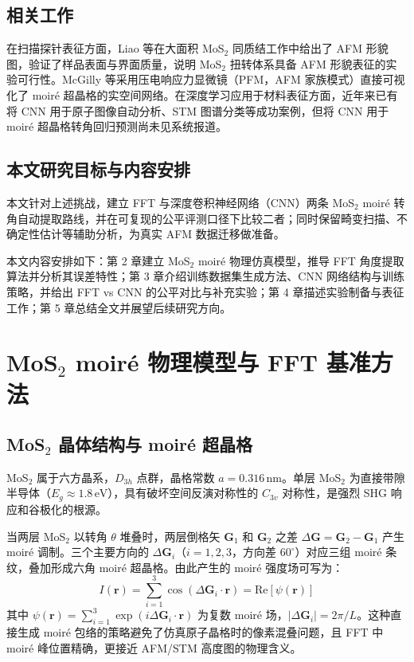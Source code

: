 \documentclass[supercite]{HustGraduPaper}
\begin{document}
\subsection{相关工作}

在扫描探针表征方面，Liao 等在大面积 MoS$_2$ 同质结工作中给出了 AFM 形貌图，验证了样品表面与界面质量，说明 MoS$_2$ 扭转体系具备 AFM 形貌表征的实验可行性\cite{liao2020precise}。McGilly 等采用压电响应力显微镜（PFM，AFM 家族模式）直接可视化了 moiré 超晶格的实空间网络\cite{mcgilly2020visualization}。在深度学习应用于材料表征方面，近年来已有将 CNN 用于原子图像自动分析\cite{o2019atomistic}、STM 图谱分类\cite{ziletti2018insight}等成功案例，但将 CNN 用于 moiré 超晶格转角回归预测尚未见系统报道。

\subsection{本文研究目标与内容安排}

本文针对上述挑战，建立 FFT 与深度卷积神经网络（CNN）两条 MoS$_2$ moiré 转角自动提取路线，并在可复现的公平评测口径下比较二者；同时保留畸变扫描、不确定性估计等辅助分析，为真实 AFM 数据迁移做准备。

本文内容安排如下：第 2 章建立 MoS$_2$ moiré 物理仿真模型，推导 FFT 角度提取算法并分析其误差特性；第 3 章介绍训练数据集生成方法、CNN 网络结构与训练策略，并给出 FFT vs CNN 的公平对比与补充实验；第 4 章描述实验制备与表征工作；第 5 章总结全文并展望后续研究方向。

\section{MoS$_2$ moiré 物理模型与 FFT 基准方法}

\subsection{MoS$_2$ 晶体结构与 moiré 超晶格}

MoS$_2$ 属于六方晶系，$D_{3h}$ 点群，晶格常数 $a = 0.316\,\mathrm{nm}$。单层 MoS$_2$ 为直接带隙半导体（$E_g \approx 1.8\,\mathrm{eV}$），具有破坏空间反演对称性的 $C_{3v}$ 对称性，是强烈 SHG 响应和谷极化的根源。

当两层 MoS$_2$ 以转角 $\theta$ 堆叠时，两层倒格矢 $\bm{G}_1$ 和 $\bm{G}_2$ 之差 $\Delta\bm{G} = \bm{G}_2 - \bm{G}_1$ 产生 moiré 调制。三个主要方向的 $\Delta\bm{G}_i$（$i = 1, 2, 3$，方向差 $60^{\circ}$）对应三组 moiré 条纹，叠加形成六角 moiré 超晶格。由此产生的 moiré 强度场可写为：
\begin{equation}
  I(\bm{r}) = \sum_{i=1}^{3} \cos(\Delta\bm{G}_i \cdot \bm{r}) = \mathrm{Re}[\psi(\bm{r})]
  \label{eq:moire_field}
\end{equation}
其中 $\psi(\bm{r}) = \sum_{i=1}^{3} \exp(i\Delta\bm{G}_i \cdot \bm{r})$ 为复数 moiré 场，$|\Delta\bm{G}_i| = 2\pi/L$。这种直接生成 moiré 包络的策略避免了仿真原子晶格时的像素混叠问题，且 FFT 中 moiré 峰位置精确，更接近 AFM/STM 高度图的物理含义。
\end{document}
